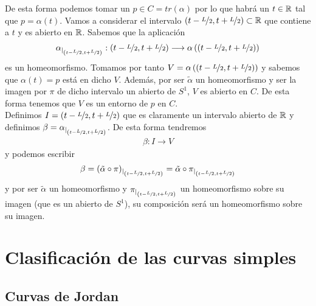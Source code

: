 \begin{ejemplo}
\begin{enumerate}
        De esta forma podemos tomar un $p\in C=tr(\alpha)$ por lo que habrá un $t\in \mathbb{R}$ tal que $p=\alpha(t)$. Vamos a considerar el intervalo $(t- \nicefrac{L}{2}, t+ \nicefrac{L}{2})\subset \mathbb{R}$ que contiene a $t$ y es abierto en $\mathbb{R}$. Sabemos que la aplicación
        \begin{gather*}
            \alpha_{|_{\left(t- \nicefrac{L}{2}, t+ \nicefrac{L}{2}\right)}} : \left(t- \nicefrac{L}{2}, t+ \nicefrac{L}{2}\right) \longrightarrow \alpha\left(\left(t- \nicefrac{L}{2}, t+ \nicefrac{L}{2}\right)\right)
        \end{gather*}
        es un homeomorfismo. Tomamos por tanto $V = \alpha\left(\left(t- \nicefrac{L}{2}, t+ \nicefrac{L}{2}\right)\right)$ y sabemos que $\alpha(t)=p$ está en dicho $V$. Además, por ser $\tilde{\alpha}$ un homeomorfismo y ser la imagen por $\pi$ de dicho intervalo un abierto de $S^1$, $V$ es abierto en $C$. De esta forma tenemos que $V$ es un entorno de $p$ en $C$.\\

        Definimos $I = \left(t- \nicefrac{L}{2}, t+ \nicefrac{L}{2}\right)$ que es claramente un intervalo abierto de $\mathbb{R}$ y definimos $\beta = \alpha_{|_{\left(t- \nicefrac{L}{2}, t+ \nicefrac{L}{2}\right)}}$. De esta forma tendremos
        \begin{gather*}
            \beta: I \longrightarrow V
        \end{gather*}
        y podemos escribir
        \begin{align*}
            \beta = (\tilde{\alpha}\circ \pi)_{|_{\left(t- \nicefrac{L}{2}, t+ \nicefrac{L}{2}\right)}}
            = \tilde{\alpha} \circ \pi_{|_{\left(t- \nicefrac{L}{2}, t+ \nicefrac{L}{2}\right)}}
        \end{align*}
        y por ser $\tilde{\alpha}$ un homeomorfismo y $\pi_{|_{\left(t- \nicefrac{L}{2}, t+ \nicefrac{L}{2}\right)}}$ un homeomorfismo sobre su imagen (que es un abierto de $S^1$), su composición será un homeomorfismo sobre su imagen.\\
    \end{enumerate}
\end{ejemplo}

\section{Clasificación de las curvas simples}

\subsection{Curvas de Jordan}

